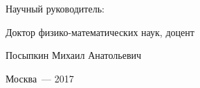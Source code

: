 %
\vspace{0pt plus4fill} %
\begin{flushright}%
Научный руководитель:

Доктор физико-математических наук, доцент

Посыпкин Михаил Анатольевич
\end{flushright}%
%
\vspace{0pt plus4fill} %
\begin{center}%
{Москва~--- 2017}
\end{center}%
\newpage
